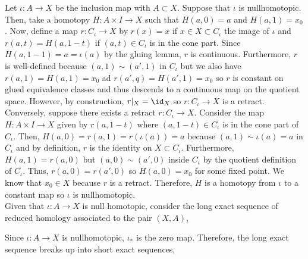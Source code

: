 \documentclass[12pt]{extarticle}
\begin{document}
Let $\iota : A \to X$ be the inclusion map with $A \subset X$. Suppose that $\iota$ is nullhomotopic. Then, take a homotopy $H : A \times I \to X$ such that $H(a, 0) = a$ and $H(a, 1) = x_0$. Now, define a map $r : C_\iota \to X$ by $r(x) = x$ if $x \in X \subset C_{\iota}$ the image of $\iota$ and $r(a, t) = H(a, 1 - t)$ if $(a, t) \in C_\iota$ is in the cone part. Since $H(a, 1-1) = a = \iota(a)$ by the gluing lemma, $r$ is continuous. Furthermore, $r$ is well-defined because $(a, 1) \sim (a', 1)$ in $C_\iota$ but we also have $r(a,1) = H(a,1) = x_0$ ad $r(a', q) = H(a', 1) = x_0$ so $r$ is constant on glued equivalence classes and thus descends to a continuous map on the quotient space. However, by construction, $r|_{X} = \id_X$ so $r : C_\iota \to X$ is a retract.  
\bigskip\\
Conversely, suppose there exists a retract $r : C_\iota \to X$. Consider the map $H : A \times I \to X$ given by $r(a, 1 - t)$ where $(a, 1 - t) \in C_\iota$ is in the cone part of $C_\iota$. Then, $H(a, 0) = r(a, 1) = r(\iota(a)) = a$ because $(a, 1) \sim \iota(a) = a$ in $C_\iota$ and by definition, $r$ is the identity on $X \subset C_\iota$. Furthermore, $H(a, 1) = r(a, 0)$ but $(a,0) \sim (a', 0)$ inside $C_{\iota}$ by the quotient definition of $C_{\iota}$. Thus, $r(a, 0) = r(a', 0)$ so $H(a, 0) = x_0$ for some fixed point. We know that $x_0 \in X$ because $r$ is a retract. Therefore, $H$ is a homotopy from $\iota$ to a constant map so $\iota$ is nullhomotopic. 
\bigskip\\
Given that $\iota : A \to X$ is null homotopic, consider the long exact sequence of reduced homology associated to the pair $(X,A)$,
\begin{center}
\end{center}  
Since $\iota : A \to X$ is nullhomotopic, $\iota_*$ is the zero map. Therefore, the long exact sequence breaks up into short exact sequences,
\begin{center}
\end{center}
\end{document}
